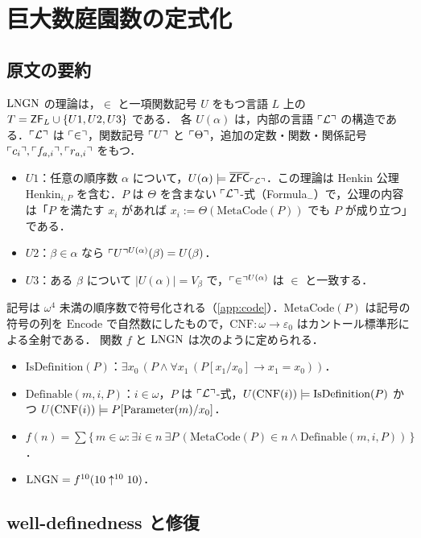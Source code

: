\section{巨大数庭園数の定式化}\label{sec:lngn}

\subsection{原文の要約}
$\mathrm{LNGN}$ \cite{lngn} の理論は，$\in$ と一項関数記号 $U$ をもつ言語 $L$ 上の $T=\mathsf{ZF}_L\cup\{U1,U2,U3\}$ である．
各 $U(\alpha)$ は，内部の言語 $\ulcorner\mathcal{L}\urcorner$ の構造である．$\ulcorner\mathcal{L}\urcorner$ は $\ulcorner \in\urcorner$，関数記号 $\ulcorner U\urcorner$ と $\ulcorner \Theta\urcorner$，追加の定数・関数・関係記号 $\ulcorner c_i\urcorner,\ulcorner f_{a,i}\urcorner,\ulcorner r_{a,i}\urcorner$ をもつ．
\begin{itemize}
\item $U1$：任意の順序数 $\alpha$ について，$U(\alpha)\models\overline{\mathsf{ZFC}}_{\ulcorner\mathcal{L}\urcorner}$．この理論は Henkin 公理 $\mathrm{Henkin}_{i,P}$ を含む．$P$ は $\Theta$ を含まない $\ulcorner\mathcal{L}\urcorner$-式（Formula$_-$）で，公理の内容は「$P$ を満たす $x_i$ があれば $x_i:=\Theta(\mathrm{MetaCode}(P))$ でも $P$ が成り立つ」である．
\item $U2$：$\beta\in\alpha$ なら $\ulcorner U\urcorner^{U(\alpha)}(\beta)=U(\beta)$．
\item $U3$：ある $\beta$ について $|U(\alpha)|=V_\beta$ で，$\ulcorner \in\urcorner^{U(\alpha)}$ は $\in$ と一致する．
\end{itemize}
記号は $\omega^4$ 未満の順序数で符号化される（\ref{app:code}）．$\mathrm{MetaCode}(P)$ は記号の符号の列を $\mathrm{Encode}$ で自然数にしたもので，$\mathrm{CNF}:\omega\to\varepsilon_0$ はカントール標準形による全射である．
関数 $f$ と $\mathrm{LNGN}$ は次のように定められる．
\begin{itemize}
\item $\mathrm{IsDefinition}(P)$：$\exists x_0\,(P\wedge\forall x_1\,(P[x_1/x_0]\to x_1=x_0))$．
\item $\mathrm{Definable}(m,i,P)$：$i\in\omega$，$P$ は $\ulcorner\mathcal{L}\urcorner$-式，$U(\mathrm{CNF}(i))\models\mathrm{IsDefinition}(P)$ かつ $U(\mathrm{CNF}(i))\models P[\mathrm{Parameter}(m)/x_0]$．
\item $f(n)=\sum\{\,m\in\omega : \exists i\in n\ \exists P\,(\mathrm{MetaCode}(P)\in n\wedge\mathrm{Definable}(m,i,P))\,\}$．
\item $\mathrm{LNGN} = f^{10}(10\uparrow^{10}10)$．
\end{itemize}

\subsection{well-definedness と修復}

